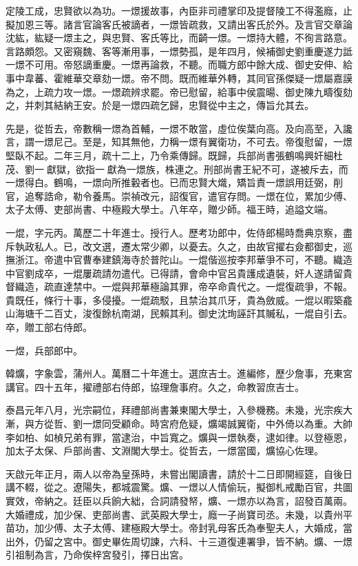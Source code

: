 \begin{pinyinscope}
定陵工成，忠賢欲以為功。一燝援故事，內臣非司禮掌印及提督陵工不得濫廕，止擬加恩三等。諸言官論客氏被謫者，一燝皆疏救，又請出客氏於外。及言官交章論沈紘，紘疑一燝主之，與忠賢、客氏等比，而齮一燝。一燝持大體，不徇言路意。言路頗怨。又密窺魏、客等漸用事，一燝勢孤，是年四月，候補御史劉重慶遂力詆一燝不可用。帝怒謫重慶。一燝再論救，不聽。而職方郎中餘大成、御史安伸、給事中韋蕃、霍維華交章劾一燝。帝不問。既而維華外轉，其同官孫傑疑一燝屬嘉謨為之，上疏力攻一燝。一燝疏辨求罷。帝已慰留，給事中侯震暘、御史陳九疇復劾之，并刺其結納王安。於是一燝四疏乞歸，忠賢從中主之，傳旨允其去。

先是，從哲去，帝數稱一燝為首輔，一燝不敢當，虛位俟葉向高。及向高至，入讒言，謂一燝尼己。至是，知其無他，力稱一燝有翼衛功，不可去。帝復慰留，一燝堅臥不起。二年三月，疏十二上，乃令乘傳歸。既歸，兵部尚書張鶴鳴興奸細杜茂、劉一獻獄，欲指一獻為一燝族，株連之。刑部尚書王紀不可，遂被斥去，而一燝得白。鶴鳴，一燝向所推轂者也。已而忠賢大熾，矯旨責一燝誤用廷弼，削官，追奪誥命，勒令養馬。崇禎改元，詔復官，遣官存問。一燝在位，累加少傅、太子太傅、吏部尚書、中極殿大學士。八年卒，贈少師。福王時，追謚文端。

一焜，字元丙。萬歷二十年進士。授行人。歷考功郎中，佐侍郎楊時喬典京察，盡斥執政私人。已，改文選，遷太常少卿，以憂去。久之，由故官擢右僉都御史，巡撫浙江。帝遣中官曹奉建鎮海寺於普陀山。一焜偕巡按李邦華爭不可，不聽。織造中官劉成卒，一焜屢疏請勿遣代。已得請，會命中官呂貴護成遺裝，奸人遂請留貴督織造，疏直達禁中。一焜與邦華極論其罪，帝卒命貴代之。一焜復疏爭，不報。貴既任，條行十事，多侵擾。一焜疏駁，且禁治其爪牙，貴為斂威。一焜以暇築龕山海塘千二百丈，浚復餘杭南湖，民賴其利。御史沈珣誣訐其贓私，一焜自引去。卒，贈工部右侍郎。

一煜，兵部郎中。

韓爌，字象雲，蒲州人。萬曆二十年進士。選庶吉士。進編修，歷少詹事，充東宮講官。四十五年，擢禮部右侍郎，協理詹事府。久之，命教習庶吉士。

泰昌元年八月，光宗嗣位，拜禮部尚書兼東閣大學士，入參機務。未幾，光宗疾大漸，與方從哲、劉一燝同受顧命。時宮府危疑，爌竭誠翼衛，中外倚以為重。大帥李如柏、如楨兄弟有罪，當逮治，中旨寬之。爌與一燝執奏，逮如律。以登極恩，加太子太保、戶部尚書、文淵閣大學士。從哲去，一燝當國，爌協心佐理。

天啟元年正月，兩人以帝為皇孫時，未嘗出閣讀書，請於十二日即開經筵，自後日講不輟，從之。遼陽失，都城震驚。爌、一燝以人情偷玩，擬御札戒勵百官，共圖實效，帝納之。廷臣以兵餉大絀，合詞請發帑，爌、一燝亦以為言，詔發百萬兩。大婚禮成，加少保、吏部尚書、武英殿大學士，廕一子尚寶司丞。未幾，以貴州平苗功，加少傅、太子太傅、建極殿大學士。帝封乳母客氏為奉聖夫人，大婚成，當出外，仍留之宮中。御史畢佐周切諫，六科、十三道復連署爭，皆不納。爌、一燝引祖制為言，乃命俟梓宮發引，擇日出宮。


\end{pinyinscope}
